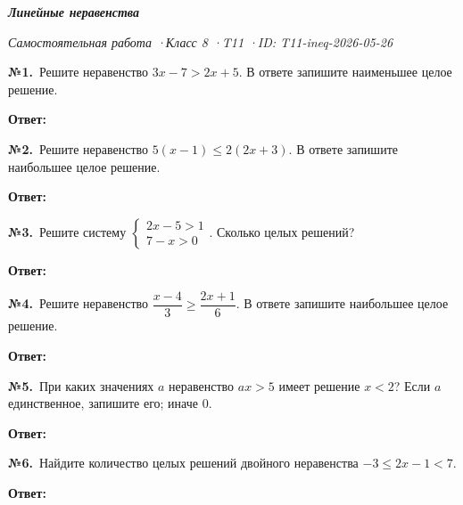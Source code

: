 \documentclass[a4paper,11pt]{article}
\renewcommand{\WorksheetTitle}[1]{%
  \par\noindent
  {\sffamily\itshape\bfseries\fontsize{22pt}{26pt}\selectfont\color{wcprimary}#1}\par
  \vspace{2mm}{\color{wcprimary!60}\rule{0.5\linewidth}{0.6pt}}\par\vspace{3mm}}
\renewcommand{\TaskBox}[2]{%
  \par\nopagebreak\noindent
  {\sffamily\bfseries\color{wcprimary}№#1.}\ #2\par
  \vspace{6mm}}
\begin{document}
\WorksheetTitle{Линейные неравенства}
{\sffamily\itshape\small\color{wcprimary!80}Самостоятельная работа \quad·\quad Класс 8 \quad·\quad T11 \quad·\quad ID: T11-ineq-2026-05-26}\par\vspace{3mm}
\FirstPageHeader

\TaskBox{1}{Решите неравенство $3x - 7 > 2x + 5$. В ответе запишите наименьшее целое решение.\par\vspace{1mm}\hfill\textbf{Ответ:}~\AnswerField{1}}

\TaskBox{2}{Решите неравенство $5(x - 1) \leqslant 2(2x + 3)$. В ответе запишите наибольшее целое решение.\par\vspace{1mm}\hfill\textbf{Ответ:}~\AnswerField{2}}

\TaskBox{3}{Решите систему $\begin{cases} 2x - 5 > 1 \\ 7 - x > 0 \end{cases}$. Сколько целых решений?\par\vspace{1mm}\hfill\textbf{Ответ:}~\AnswerField{3}}

\TaskBox{4}{Решите неравенство $\dfrac{x - 4}{3} \geqslant \dfrac{2x + 1}{6}$. В ответе запишите наибольшее целое решение.\par\vspace{1mm}\hfill\textbf{Ответ:}~\AnswerField{4}}

\TaskBox{5}{При каких значениях $a$ неравенство $ax > 5$ имеет решение $x < 2$? Если $a$ единственное, запишите его; иначе $0$.\par\vspace{1mm}\hfill\textbf{Ответ:}~\AnswerField{5}}

\TaskBox{6}{Найдите количество целых решений двойного неравенства $-3 \leqslant 2x - 1 < 7$.\par\vspace{1mm}\hfill\textbf{Ответ:}~\AnswerField{6}}

\end{document}
